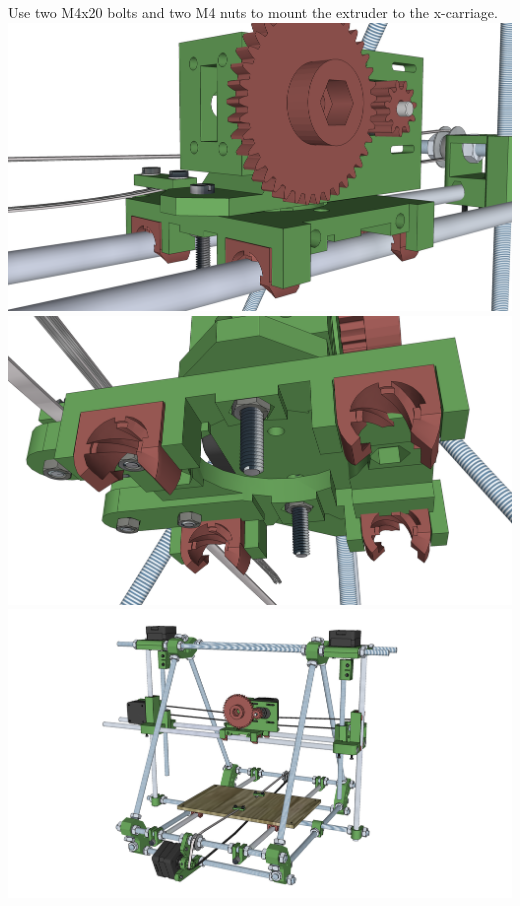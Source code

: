 \documentclass[twoside,openany,a4paper,titlepage]{memoir}
\begin{document}
	\section{}
	Use two M4x20 bolts and two M4 nuts to mount the extruder to the x-carriage.\\
	\includegraphics[width=1\linewidth]{graphics/ch9_17_1.png}
	\includegraphics[width=1\linewidth]{graphics/ch9_17_2.png}
	\includegraphics[width=1\linewidth]{graphics/ch9_17_3.png}
	
\end{document}
